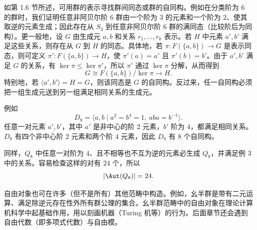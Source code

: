 如第 1.6 节所述，可用群的表示寻找群间同态或群的自同构。例如在分类阶为 $6$ 的群时，我们证明任意非阿贝尔阶 $6$ 群由一个阶为 $3$ 的元素和一个阶为 $2$、使其取逆的元素生成；因此存在从 $S_3$ 到任意非阿贝尔阶 $6$ 群的满同态（比较阶后为同构）。更一般地，设 $G$ 由生成元 $a,b$ 和关系 $r_1,
\ldots,r_k$ 表示。若 $H$ 中元素 $a',b'$ 满足这些关系，则存在从 $G$ 到 $H$ 的同态。具体地，若 $\pi:F(\{a,b\})\to G$ 是表示同态，则可定义 $\pi':F(\{a,b\})\to H$，使 $\pi'(a)=a'$ 且 $\pi'(b)=b'$。由于 $a',b'$ 满足 $G$ 的关系，有 $\ker\pi\leq\ker\pi'$，所以 $\pi'$ 通过 $\ker\pi$ 分解，从而得到
\[
  G\cong F(\{a,b\})/\ker\pi\longrightarrow H.
\]
特别地，若 $\langle a',b'\rangle=H=G$，则该同态是 $G$ 的自同构。反过来，任一自同构必须把一组生成元送到另一组满足相同关系的生成元。

例如
\[
  D_8=\langle a,b\mid a^2=b^4=1,
\ aba=b^{-1}\rangle.
\]
任意一对元素 $a',b'$，其中 $a'$ 是非中心的阶 $2$ 元素，$b'$ 阶为 $4$，都满足相同关系。$D_8$ 有四个非中心阶 $2$ 元素和两个阶 $4$ 元素，因此 $D_8$ 有 $8$ 个自同构。

同样，$Q_8$ 中任意一对阶为 $4$、且不相等也不互为逆的元素必生成 $Q_8$，并满足例 3 中的关系。容易检查这样的对有 $24$ 个，所以
\[
  |\Aut(Q_8)|=24.
\]

自由对象也可在许多（但不是所有）其他范畴中构造。例如，幺半群是带有二元运算、满足除逆元存在性外所有群公理的集合。幺半群范畴中的自由对象在理论计算机科学中起基础作用，用以刻画机器（Turing 机等）的行为。后面章节还会遇到自由代数（即多项式代数）与自由模。

